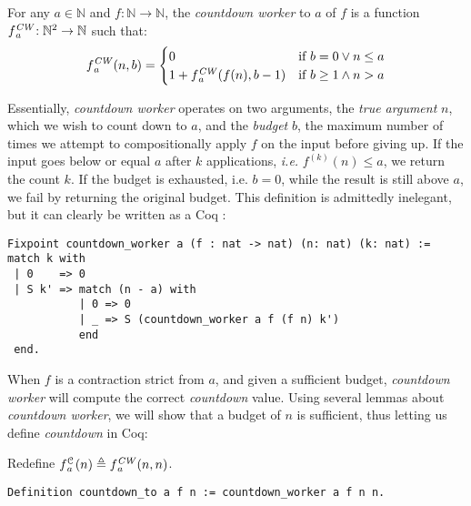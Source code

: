 \begin{defn} \label{defn: countdown-worker}
For any $a\in \mathbb{N}$ and $f: \mathbb{N}\to \mathbb{N}$, the \emph{countdown worker} to $a$ of $f$ is a function $\cdw{f}{a}\ : \mathbb{N}^2\to \mathbb{N}$ such that:
\begin{equation*}
\cdw{f}{a}(n, b) = \begin{cases}
0 & \text{if } b = 0 \vee n\le a \\ 1 +\cdw{f}{a}(f(n), b-1) & \text{if } b \ge 1 \wedge n > a
\end{cases}
\end{equation*}
\end{defn}
Essentially, \emph{countdown worker} operates on two arguments, the \emph{true argument} $n$, which we wish to count down to $a$, and the \emph{budget} $b$, the maximum number of times we attempt 
to compositionally apply $f$ on the input before giving up. If the input goes below or equal $a$ after $k$ applications, \emph{i.e.} $f^{(k)}(n) \le a$, we return the count $k$. If the budget is exhausted, i.e. $b = 0$, while the result is still above $a$, we fail by returning the original budget. This definition is admittedly inelegant, but it can clearly be written as a Coq :
\begin{lstlisting}
Fixpoint countdown_worker a (f : nat -> nat) (n: nat) (k: nat) :=
match k with
 | 0    => 0
 | S k' => match (n - a) with
           | 0 => 0
           | _ => S (countdown_worker a f (f n) k') 
           end
 end.
\end{lstlisting}
When $f$ is a contraction strict from $a$, and given a sufficient budget, \emph{countdown worker} 
will compute the correct \emph{countdown} value.  
Using several lemmas about \emph{countdown worker},
we will show that a budget of $n$ is sufficient, thus letting us define \emph{countdown} in Coq:
\begin{defn} \label{defn: countdown}
Redefine $\cdt{f}{a}(n) \triangleq \cdw{f}{a}(n, n)$.
\begin{lstlisting}
Definition countdown_to a f n := countdown_worker a f n n.
\end{lstlisting}
\end{defn}
